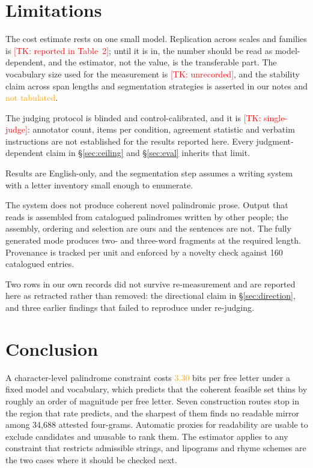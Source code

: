 \documentclass[11pt]{article}
\newif\ifprovenance\provenancetrue
\newcommand{\unver}[1]{\ifprovenance\textcolor{orange}{#1}\else#1\fi}
\newcommand{\tk}[1]{\ifprovenance\textcolor{red}{[TK: #1]}\else#1\fi}
\begin{document}
\section{Limitations}
\label{sec:limitations}

The cost estimate rests on one small model. Replication across scales and
families is \tk{reported in Table~2}; until it is in, the number should be read
as model-dependent, and the estimator, not the value, is the transferable part.
The vocabulary size used for the measurement is \tk{unrecorded}, and the
stability claim across span lengths and segmentation strategies is asserted in
our notes and \unver{not tabulated}.

The judging protocol is blinded and control-calibrated, and it is
\tk{single-judge}: annotator count, items per condition, agreement statistic
and verbatim instructions are not established for the results reported here.
Every judgment-dependent claim in \S\ref{sec:ceiling} and \S\ref{sec:eval}
inherits that limit.

Results are English-only, and the segmentation step assumes a writing system
with a letter inventory small enough to enumerate.

The system does not produce coherent novel palindromic prose. Output that reads
is assembled from catalogued palindromes written by other people; the assembly,
ordering and selection are ours and the sentences are not. The fully generated
mode produces two- and three-word fragments at the required length. Provenance
is tracked per unit and enforced by a novelty check against 160 catalogued
entries.

Two rows in our own records did not survive re-measurement and are reported
here as retracted rather than removed: the directional claim in
\S\ref{sec:direction}, and three earlier findings that failed to reproduce
under re-judging.

\section{Conclusion}

A character-level palindrome constraint costs \unver{3.30} bits per free letter
under a fixed model and vocabulary, which predicts that the coherent feasible
set thins by roughly an order of magnitude per free letter. Seven construction
routes stop in the region that rate predicts, and the sharpest of them finds no
readable mirror among 34{,}688 attested four-grams. Automatic proxies for
readability are usable to exclude candidates and unusable to rank them. The
estimator applies to any constraint that restricts admissible strings, and
lipograms and rhyme schemes are the two cases where it should be checked next.
\end{document}
